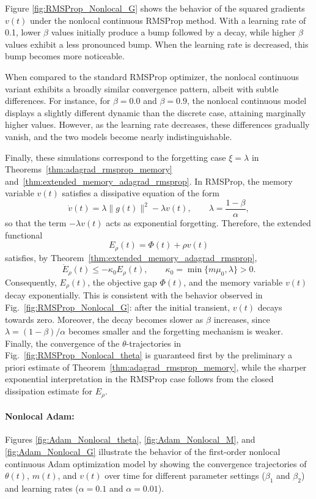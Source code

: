 \documentclass{article} %
\begin{document}
Figure \ref{fig:RMSProp_Nonlocal_G} shows the behavior of the squared gradients \(v(t)\) under the nonlocal continuous RMSProp method. With a learning rate of 0.1, lower \(\beta\) values initially produce a bump followed by a decay, while higher \(\beta\) values exhibit a less pronounced bump. When the learning rate is decreased, this bump becomes more noticeable.

When compared to the standard RMSProp optimizer, the nonlocal continuous variant exhibits a broadly similar convergence pattern, albeit with subtle differences. For instance, for \(\beta = 0.0\) and \(\beta = 0.9\), the nonlocal continuous model displays a slightly different dynamic than the discrete case, attaining marginally higher values. However, as the learning rate decreases, these differences gradually vanish, and the two models become nearly indistinguishable.

Finally, these simulations correspond to the forgetting case $\xi=\lambda$ in Theorems~\ref{thm:adagrad_rmsprop_memory} and~\ref{thm:extended_memory_adagrad_rmsprop}. In RMSProp, the memory variable $v(t)$ satisfies a dissipative equation of the form
\[
    \dot v(t)=\lambda\|g(t)\|^2-\lambda v(t),
    \qquad 
    \lambda=\frac{1-\beta}{\alpha},
\]
so that the term $-\lambda v(t)$ acts as exponential forgetting. Therefore, the extended functional
\[
    E_\rho(t)=\Phi(t)+\rho v(t)
\]
satisfies, by Theorem~\ref{thm:extended_memory_adagrad_rmsprop},
\[
    \dot E_\rho(t)\leq -\kappa_0 E_\rho(t),
    \qquad 
    \kappa_0=\min\{m\mu_0,\lambda\}>0.
\]
Consequently, $E_\rho(t)$, the objective gap $\Phi(t)$, and the memory variable $v(t)$ decay exponentially. This is consistent with the behavior observed in Fig.~\ref{fig:RMSProp_Nonlocal_G}: after the initial transient, $v(t)$ decays towards zero. Moreover, the decay becomes slower as $\beta$ increases, since $\lambda=(1-\beta)/\alpha$ becomes smaller and the forgetting mechanism is weaker. Finally, the convergence of the $\theta$-trajectories in Fig.~\ref{fig:RMSProp_Nonlocal_theta} is guaranteed first by the preliminary a priori estimate of Theorem~\ref{thm:adagrad_rmsprop_memory}, while the sharper exponential interpretation in the RMSProp case follows from the closed dissipation estimate for $E_\rho$.

\paragraph{Nonlocal Adam:} Figures \ref{fig:Adam_Nonlocal_theta}, \ref{fig:Adam_Nonlocal_M}, and \ref{fig:Adam_Nonlocal_G} illustrate the behavior of the first-order nonlocal continuous Adam optimization model by showing the convergence trajectories of \(\theta(t)\), \(m(t)\), and \(v(t)\) over time for different parameter settings (\(\beta_1\) and \(\beta_2\)) and learning rates (\(\alpha = 0.1\) and \(\alpha = 0.01\)).
\end{document}
